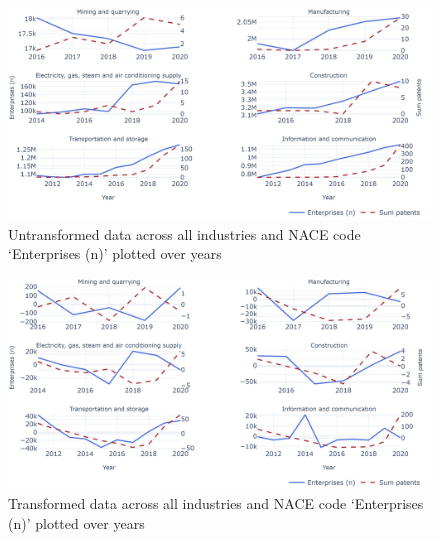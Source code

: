 \documentclass[
  12pt,
  a4paperpaper,
]{article}
\begin{document}
\begin{figure}[H]

{\centering \includegraphics{rieg2023_files/figure-pdf/fig-untransformed-data-enterprises-output-1.jpeg}

}

\caption{\label{fig-untransformed-data-enterprises}Untransformed data
across all industries and NACE code `Enterprises (n)' plotted over
years}

\end{figure}

\begin{figure}[H]

{\centering \includegraphics{rieg2023_files/figure-pdf/fig-transformed-data-example-enterprises-output-1.jpeg}

}

\caption{\label{fig-transformed-data-example-enterprises}Transformed
data across all industries and NACE code `Enterprises (n)' plotted over
years}

\end{figure}
\end{document}
